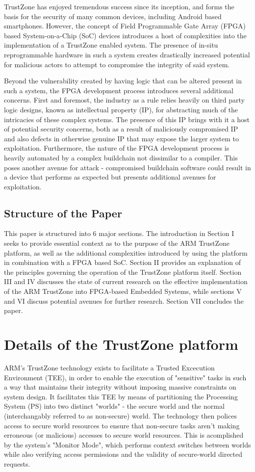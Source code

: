 \documentclass[journal]{IEEEtran}
\begin{document}
TrustZone has enjoyed tremendous success since its inception, and forms the basis for the
security of many common devices, including Android based smartphones. However, the concept
of Field Programmable Gate Array (FPGA) based System-on-a-Chip (SoC) devices introduces a
host of complexities into the implementation of a TrustZone enabled system. The
presence of in-situ reprogrammable hardware in such a system creates drastically increased
potential for malicious actors to attempt to compromise the integrity of said system.

Beyond the vulnerability created by having logic that can be altered present in such a
system, the FPGA development process introduces several additional concerns. First and
foremost, the industry as a rule relies heavily on third party logic designs, known as 
intellectual property (IP), for abstracting much of the intricacies of these complex 
systems. The presence of this IP brings with it a host of potential security concerns,
both as a result of maliciously compromised IP and also defects in otherwise genuine IP 
that may expose the larger system to exploitation. Furthermore, the nature of the FPGA
development process is heavily automated by a complex buildchain not dissimilar to a
compiler. This poses another avenue for attack - compromised buildchain software could
result in a device that performs as expected but presents additional avenues for
exploitation.

\subsection{Structure of the Paper}
This paper is structured into 6 major sections. The introduction in Section I seeks to
provide essential context as to the purpose of the ARM TrustZone platform, as well as the 
additional complexities introduced by using the platform in combination with a FPGA based 
SoC. Section II provides an explanation of the principles governing the operation of the 
TrustZone platform itself. Section III and IV discusses the state of current research on
the effective implementation of the ARM TrustZone into FPGA-based Embedded Systems, while 
sections V and VI discuss potential avenues for further research. Section VII concludes 
the paper.

\section{Details of the TrustZone platform}
ARM's TrustZone technology exists to facilitate a Trusted Excecution Environment (TEE), in
order to enable the execution of "sensitive" tasks in such a way that maintains their
integrity without imposing massive constraints on system design. It facilitates this TEE
by means of partitioning the Processing System (PS) into two distinct "worlds" - the
secure world and the normal (interchangably referred to as non-secure) world. The
technology then polices access to secure world resources to ensure that non-secure tasks
aren't making erroneous (or malicious) accesses to secure world resources. This is
acomplished by the system's "Monitor Mode", which performs context switches between worlds
while also verifying access permissions and the validity of secure-world directed requests.
\end{document}
